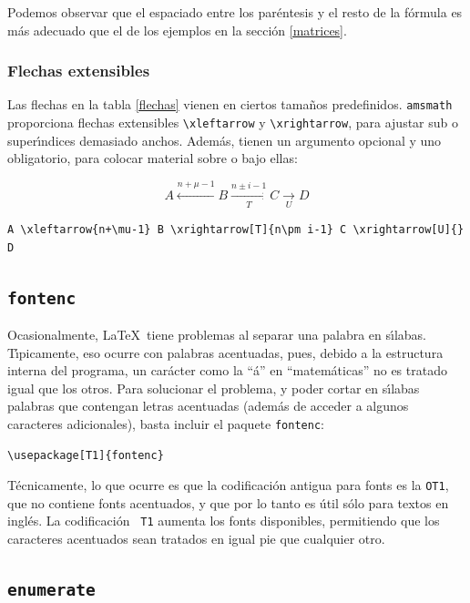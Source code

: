 {Podemos observar que el espaciado entre los par\'entesis y el resto de
la f\'ormula es m\'as adecuado que el de los ejemplos en la secci\'on
\ref{matrices}. 

\subsubsection{Flechas extensibles}

Las flechas en la tabla \ref{flechas} vienen en ciertos tama\~nos
predefinidos. \verb+amsmath+ proporciona flechas extensibles
\verb+\xleftarrow+ y \verb+\xrightarrow+, para ajustar sub o
super\'{\i}ndices demasiado anchos. Adem\'as, tienen un argumento
opcional y uno obligatorio, para colocar material sobre o bajo ellas:

{\small
\begin{equation*}
A \xleftarrow{n+\mu-1} B \xrightarrow[T]{n\pm i-1} C \xrightarrow[U]{} D
\end{equation*}
 
\begin{verbatim}
A \xleftarrow{n+\mu-1} B \xrightarrow[T]{n\pm i-1} C \xrightarrow[U]{} D
\end{verbatim}
}

\subsection{{\tt fontenc}}

Ocasionalmente, \LaTeX\ tiene problemas al separar una palabra en
s\'{\i}labas. T\'{\i}picamente, eso ocurre con palabras acentuadas,
pues, debido a la estructura interna del programa, un car\'acter como
la ``\'a'' en ``matem\'aticas'' no es tratado igual que los
otros. Para solucionar el problema, y poder cortar en s\'{\i}labas palabras que
contengan letras acentuadas (adem\'as de acceder a algunos caracteres
adicionales), basta incluir el paquete \verb+fontenc+:

\begin{verbatim}
\usepackage[T1]{fontenc}
\end{verbatim}

T\'ecnicamente, lo que ocurre es que la codificaci\'on antigua para
fonts es la {\tt OT1}, que no contiene fonts acentuados, y que por lo
tanto es \'util s\'olo para textos en ingl\'es. La codificaci\'on {\tt
  T1} aumenta los fonts disponibles, permitiendo que los caracteres
acentuados sean tratados en igual pie que cualquier otro. 


\subsection{{\tt enumerate}}

}
